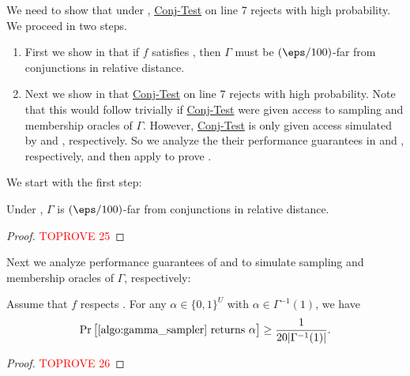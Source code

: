\documentclass[11pt]{article}
\theoremstyle{definition}
\begin{document}
We need to show that under , 
\hyperlink{Algorithm2}{\sc Conj-Test} on line 7
  rejects with high probability. 
We proceed in two steps.
\begin{flushleft}\begin{enumerate}
\item First we show in  that if $f$ satisfies ,
  then $\Gamma$ must be $(\eps/100)$-far from conjunctions in
  relative distance. 
\item Next we show in  that \hyperlink{Algorithm2}{\sc Conj-Test} on line 7 rejects with high probability. Note that this would follow trivially if \hyperlink{Algorithm2}{\sc Conj-Test} were given access to sampling and membership oracles of $\Gamma$.
However, \hyperlink{Algorithm2}{\sc Conj-Test} is only given access simulated by  and ,
  respectively. 
So we analyze the their performance guarantees in 
  and , respectively, and then apply  to prove .
\end{enumerate}\end{flushleft}

We start with the first step:
\begin{lemma}\label{thm: f would be close to DL}
Under 
  , $\Gamma$
  is $(\eps/100)$-far from conjunctions in relative distance.
\end{lemma}
\begin{proof}\textcolor{red}{TOPROVE 25}\end{proof}




Next we analyze performance guarantees of 
  and  to simulate sampling and membership
  oracles of $\Gamma$, respectively:

\begin{lemma}\label{thm: samples are almost uniform}
    Assume that $f$ respects . 
    For any $\alpha\in \{0,1\}^U$ with $\alpha \in \Gamma^{-1}(1)$, we have
$$
\Pr\big[\text{\Cref{algo:gamma_sampler} returns }\alpha\big] \geq \frac{1}{20|\Gamma^{-1}(1)|}.$$
\end{lemma}
\begin{proof}\textcolor{red}{TOPROVE 26}\end{proof}
\end{document}
